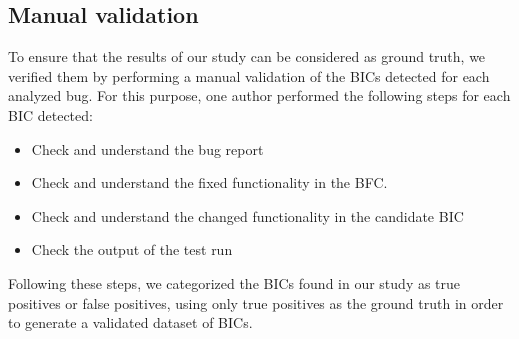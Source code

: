 
\subsection{Manual validation}
\label{subsec:manual}

To ensure that the results of our study can be considered as ground truth, we verified them by performing a manual validation of the BICs detected for each analyzed bug. For this purpose, one author performed the following steps for each BIC detected:

\begin{itemize}
    \item Check and understand the bug report
    \item Check and understand the fixed functionality in the BFC.
    \item Check and understand the changed functionality in the candidate BIC
    \item Check the output of the test run
\end{itemize}

Following these steps, we categorized the BICs found in our study as true positives or false positives, using only true positives as the ground truth in order to generate a validated dataset of BICs.

